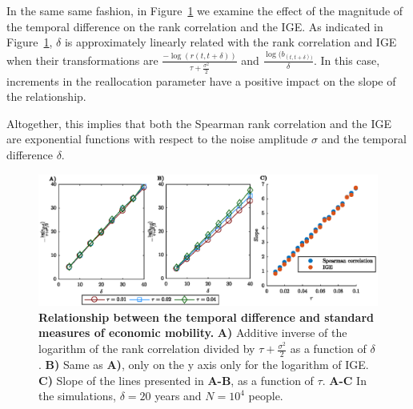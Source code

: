 \documentclass[11pt]{article}
\newcommand{\Fref}[1]{Figure~\ref{fig:#1}}
\numberwithin{equation}{section}
\begin{document}
In the same same fashion, in \Fref{rgbm-standard-measures-delta} we examine the effect of the magnitude of the temporal difference on the rank correlation and the IGE. As indicated in \Fref{rgbm-standard-measures-delta}, $\delta$ is approximately linearly related with the rank correlation and IGE when their transformations are $\frac{-\log(r(t,t+\delta))}{\tau + \frac{\sigma^2}{2}}$ and $\frac{\log(b_{(t,t+\delta))}}{\delta}$. In this case, increments in the reallocation parameter have a positive impact on the slope of the relationship.

Altogether, this implies that both the Spearman rank correlation and the IGE are exponential functions with respect to the noise amplitude $\sigma$ and the temporal difference $\delta$.

\begin{figure}[!htb]
\centering
\includegraphics[width=1.0\textwidth]{figs/fig_rgbm_delta_relationship.eps}
\caption{\textbf{Relationship between the temporal difference and standard measures of economic mobility.} \textbf{A)} Additive inverse of the logarithm of the rank correlation divided by $\tau +\frac{\sigma^2}{2}$ as a function of $\delta$. \textbf{B)} Same as \textbf{A)}, only on the y axis only for the logarithm of IGE. \textbf{C)} Slope of the lines presented in \textbf{A-B}, as a function of $\tau$. 
\textbf{A-C} In the simulations, $\delta = 20$ years and $N = 10^4$ people.
\label{fig:rgbm-standard-measures-delta}}
\end{figure}
\FloatBarrier
\end{document}
